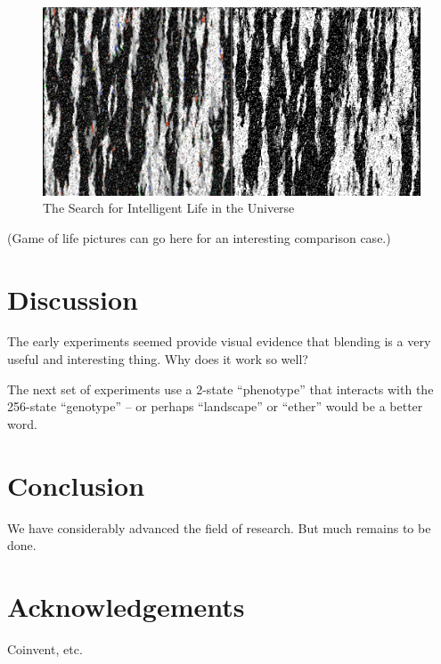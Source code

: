 \documentclass{AISB2008}
\begin{document}
\begin{figure}
\includegraphics[width=\columnwidth]{seti.png}
\caption{The Search for Intelligent Life in the Universe}
\end{figure}
\clearpage
(Game of life pictures can go here for an interesting comparison
case.)
\newpage

\section{Discussion}

The early experiments seemed provide visual evidence that blending is
a very useful and interesting thing.  Why does it work so well? 

The next set of experiments use a 2-state ``phenotype'' that interacts
with the 256-state ``genotype'' -- or perhaps ``landscape'' or
``ether'' would be a better word.

\clearpage

\section{Conclusion}
\nocite{*}
We have considerably advanced the field of research.
But much remains to be done.


\section{Acknowledgements}

Coinvent, etc.


\end{document}
